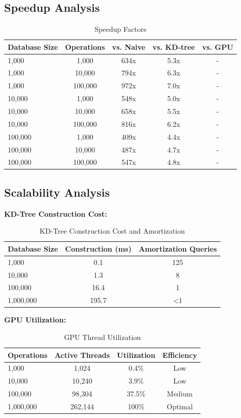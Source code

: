 \documentclass{article}
\begin{document}
\subsection{Speedup Analysis}

\begin{table}[h]
\centering
\begin{tabular}{lcccc}
\toprule
Database Size & Operations & vs. Naive & vs. KD-tree & vs. GPU \\
\midrule
1,000 & 1,000 & 634x & 5.3x & - \\
1,000 & 10,000 & 794x & 6.3x & - \\
1,000 & 100,000 & 972x & 7.0x & - \\
10,000 & 1,000 & 548x & 5.0x & - \\
10,000 & 10,000 & 658x & 5.5x & - \\
10,000 & 100,000 & 816x & 6.2x & - \\
100,000 & 1,000 & 409x & 4.4x & - \\
100,000 & 10,000 & 487x & 4.7x & - \\
100,000 & 100,000 & 547x & 4.8x & - \\
\bottomrule
\end{tabular}
\caption{Speedup Factors}
\end{table}

\subsection{Scalability Analysis}

\textbf{KD-Tree Construction Cost:}
\begin{table}[h]
\centering
\begin{tabular}{lcc}
\toprule
Database Size & Construction (ms) & Amortization Queries \\
\midrule
1,000 & 0.1 & 125 \\
10,000 & 1.3 & 8 \\
100,000 & 16.4 & 1 \\
1,000,000 & 195.7 & <1 \\
\bottomrule
\end{tabular}
\caption{KD-Tree Construction Cost and Amortization}
\end{table}

\textbf{GPU Utilization:}
\begin{table}[h]
\centering
\begin{tabular}{lccc}
\toprule
Operations & Active Threads & Utilization & Efficiency \\
\midrule
1,000 & 1,024 & 0.4\% & Low \\
10,000 & 10,240 & 3.9\% & Low \\
100,000 & 98,304 & 37.5\% & Medium \\
1,000,000 & 262,144 & 100\% & Optimal \\
\bottomrule
\end{tabular}
\caption{GPU Thread Utilization}
\end{table}
\end{document}
